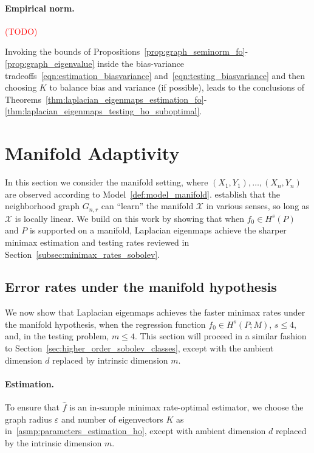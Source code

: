 \documentclass{article}
\newcommand{\1}{\mathbf{1}}
\newcommand{\Xset}{\mathcal{X}}
\newcommand{\wh}[1]{\widehat{#1}}
\theoremstyle{alden}
\theoremstyle{aldenthm}
\theoremstyle{definition}
\theoremstyle{remark}
\begin{document}
\paragraph{Empirical norm.}
\textcolor{red}{(TODO)}


Invoking the bounds of Propositions~\ref{prop:graph_seminorm_fo}-\ref{prop:graph_eigenvalue} inside the bias-variance tradeoffs~\eqref{eqn:estimation_biasvariance} and~\eqref{eqn:testing_biasvariance} and then choosing $K$ to balance bias and variance (if possible), leads to the conclusions of Theorems~\ref{thm:laplacian_eigenmaps_estimation_fo}-\ref{thm:laplacian_eigenmaps_testing_ho_suboptimal}.


\section{Manifold Adaptivity}
\label{sec:manifold_adaptivity}

In this section we consider the manifold setting, where $(X_1,Y_1),\ldots,(X_n,Y_n)$ are observed according to Model~\ref{def:model_manifold}. \citet{belkin03,belkin05,niyogi2013} establish that the neighborhood graph $G_{n,r}$ can ``learn'' the manifold $\Xset$ in various senses, so long as $\Xset$ is locally linear. We build on this work by showing that when $f_0 \in H^s(P)$ and $P$ is supported on a manifold, Laplacian eigenmaps achieve the sharper minimax estimation and testing rates reviewed in Section~\ref{subsec:minimax_rates_sobolev}.

\subsection{Error rates under the manifold hypothesis}
We now show that Laplacian eigenmaps achieves the faster minimax rates under the manifold hypothesis, when the regression function $f_0 \in H^s(P;M)$, $s \leq 4$, and, in the testing problem, $m \leq 4$. This section will proceed in a similar fashion to Section~\ref{sec:higher_order_sobolev_classes}, except with the ambient dimension $d$ replaced by intrinsic dimension $m$. 

\paragraph{Estimation.}
To ensure that $\wh{f}$ is an in-sample minimax rate-optimal estimator, we choose the graph radius $\varepsilon$ and number of eigenvectors $K$ as in~\ref{asmp:parameters_estimation_ho}, except with ambient dimension $d$ replaced by the intrinsic dimension $m$.
\end{document}
